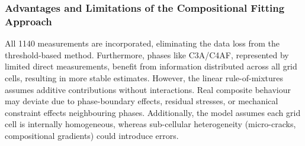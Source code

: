 \subsubsection*{Advantages and Limitations of the Compositional Fitting Approach}

All \num{1140} measurements are incorporated, eliminating the data loss from the threshold-based method. 
Furthermore, phases like \acs{C3A}/\acs{C4AF}, represented by limited direct measurements, benefit from information distributed across all grid cells, resulting in more stable estimates.
However, the linear rule-of-mixtures assumes additive contributions without interactions.
Real composite behaviour may deviate due to phase-boundary effects, residual stresses, or mechanical constraint effects neighbouring phases.
Additionally, the model assumes each grid cell is internally homogeneous, whereas sub-cellular heterogeneity (micro-cracks, compositional gradients) could introduce errors.


